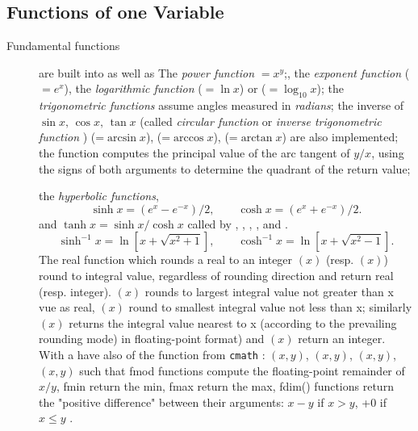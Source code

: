 \documentclass[a4paper,twoside,12pt]{book}
\def\setS#1{#1\label{sec:#1}}
\begin{document}
\subsection{\setS{Functions of one Variable}}
\begin{description}
\item[Fundamental functions] 
are built into \freefempp as well as
%
The \emph{power function} $=x^y$;,
the \emph{exponent function}  ($=e^x$),
the \emph{logarithmic function} ($=\ln x$) or
 ($=\log_{10}x$);
the \emph{trigonometric functions} 
assume angles measured in \emph{radians};
the inverse of $\sin x,\, \cos x,\, \tan x$ (called \emph{circular function} or \emph{inverse trigonometric function} )
(=$\arcsin x$), (=$\arccos x$), (=$\arctan x$) are also implemented;
the  function computes the principal value of the arc tangent of
     $y/x$, using the signs of both arguments to determine the quadrant of the
     return value;

the \emph{hyperbolic functions},
\[
\sinh x=\left( e^x-e^{-x}\right)/2,\qquad
\cosh x=\left( e^x+e^{-x}\right)/2.
\]
and $\tanh x=\sinh x/\cosh x$ called
by , , , ,
 and .
\[
\sinh^{-1}x=\ln \left[x+\sqrt{x^2+1}\right],\qquad
\cosh^{-1}x=\ln \left[x+\sqrt{x^2-1}\right].
\]
The  real function which rounds a real to an integer   $(x)$ (resp. $(x)$) round to integral value, regardless of rounding direction and return real (resp.  integer).
$(x)$   rounds to largest integral value not greater than x vue as real, $(x)$  round to smallest integral value not less than x; similarly $(x)$
returns the integral value nearest to x (according to
     the prevailing rounding mode) in floating-point format) and $(x)$ return an integer.
     With a have also of the function from \texttt{cmath} :  $(x,y)$, $(x,y)$, $(x,y)$,$(x,y)$  such that 
     fmod functions compute the floating-point remainder of $x/ y$, fmin return the min, fmax return the max, 
     fdim() functions return the "positive difference" between their arguments:  $x - y$ if $x > y$, +$0$ if $x \le y$ .
     

\end{description}
\end{document}

